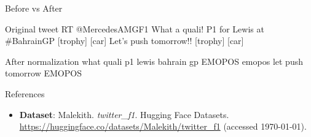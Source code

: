 \documentclass[aspectratio=169]{beamer}
\begin{document}
\begin{frame}{Before vs After}
\small
\begin{block}{Original tweet}
  RT @MercedesAMGF1 What a quali! P1 for Lewis at \#BahrainGP [trophy] [car] Let's push tomorrow!! [trophy] [car]
\end{block}
\begin{block}{After normalization }
  \small what quali p1 lewis bahrain gp EMOPOS emopos let push tomorrow EMOPOS
\end{block}
\end{frame}

\begin{frame}{References}
\small
\begin{itemize}
  \item \textbf{Dataset}: Malekith. \textit{twitter\_f1}. Hugging Face Datasets. \url{https://huggingface.co/datasets/Malekith/twitter_f1} (accessed \today).
\end{itemize}
\end{frame}
\end{document}
